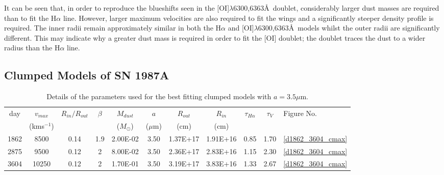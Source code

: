 \documentclass[useAMS,usenatbib,usegraphicx]{mnras}
\begin{document}
It can be seen that, in order to reproduce the blueshifts seen in the [OI]$\lambda$6300,6363\AA\ doublet, considerably larger dust masses are required than to fit the H$\alpha$ line.  However, larger maximum velocities are also required to fit the wings and a significantly steeper density profile is required.  The inner radii remain approximately similar in both the H$\alpha$ and [OI]$\lambda$6300,6363\AA\ models whilst the outer radii are significantly different.  This may indicate why a greater dust mass is required in order to fit the [OI] doublet; the doublet traces the dust to a wider radius than the H$\alpha$ line.



\subsection{Clumped Models of SN 1987A}
\label{clumped_models}


\begin{table}
	\begin{minipage}{180mm}
	\caption{Details of the parameters used for the best fitting clumped models with $a=3.5\mu$m.}
	\label{clumped2}
	\begin{center}
  	\begin{tabular}{@{} ccccccccccl @{}}
    	\hline
  day & $v_{max}$ & $R_{in}/R_{out}$ & $\beta$ & $M_{dust}$ & $a$ & $R_{out}$ & $R_{in}$ & $\tau_{H\alpha}$ & $\tau_V$ & Figure No. \\
	& (kms$^{-1} $) & & & ($M_{\odot}$) & ($\mu$m) & (cm) & (cm)  \\
	\hline
1862 & 8500 & 0.14 & 1.9 & 2.00E-02 & 3.50 & 1.37E+17 & 1.91E+16 & 0.85 & 1.70 & \ref{d1862_3604_cmax} \\
2875 & 9500 & 0.12 & 2 & 8.00E-02 & 3.50 & 2.36E+17 & 2.83E+16 & 1.15 & 2.30 & \ref{d1862_3604_cmax} \\
3604 & 10250 & 0.12 & 2 & 1.70E-01 & 3.50 & 3.19E+17 & 3.83E+16 & 1.33 & 2.67 & \ref{d1862_3604_cmax} \\
    \hline
  \end{tabular}
  \end{center}
\end{minipage}
\end{table}
\end{document}
